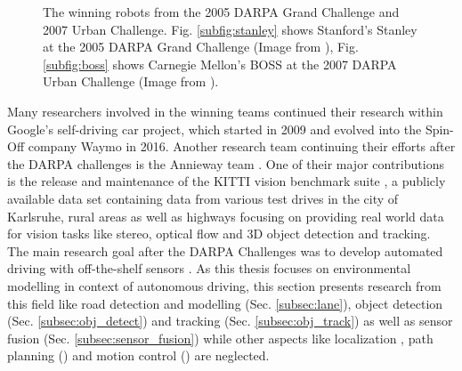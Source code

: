 \begin{figure}[t!]
	\centering
	\caption{The winning robots from the 2005 \ac{DARPA} Grand Challenge and 2007 Urban Challenge. Fig. \ref{subfig:stanley} shows Stanford's Stanley at the 2005 \ac{DARPA} Grand Challenge (Image from \cite{Thrun2006}), Fig. \ref{subfig:boss} shows Carnegie Mellon's BOSS at the 2007 \ac{DARPA} Urban Challenge (Image from \cite{Urmson.2008}).}\label{fig:darpa_chal}
\end{figure}
Many researchers involved in the winning teams continued their research within Google's self-driving car project, which started in 2009 and evolved into the Spin-Off company Waymo \cite{Waymo} in 2016.
Another research team continuing their efforts after the \ac{DARPA} challenges is the Annieway team \cite{Annieway}.
One of their major contributions is the release and maintenance of the KITTI vision benchmark suite \cite{Geiger2013IJRR}, a publicly available data set containing data from various test drives in the city of Karlsruhe, rural areas as well as highways focusing on providing real world data for vision tasks like stereo, optical flow and 3D object detection and tracking.\\
The main research goal after the \ac{DARPA} Challenges was to develop automated driving with off-the-shelf sensors \cite{Furgale2013}.
As this thesis focuses on environmental modelling in context of autonomous driving, this section presents research from this field like road detection and modelling (Sec. \ref{subsec:lane}), object detection (Sec. \ref{subsec:obj_detect}) and tracking (Sec. \ref{subsec:obj_track}) as well as sensor fusion (Sec. \ref{subsec:sensor_fusion}) while other aspects like localization \cite{Levinson2010, Thrun2005}, path planning () and motion control () are neglected.
